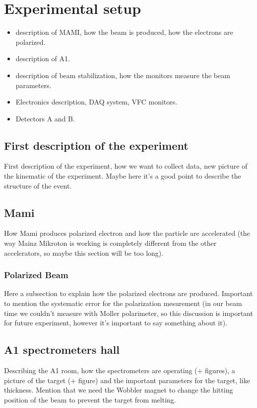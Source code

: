 \chapter{Experimental setup} \label{experiment}

\begin{itemize}
\item description of MAMI, how the beam is produced, how the electrons are polarized.
\item description of A1.
\item description of beam stabilization, how the monitors measure the beam parameters.
\item Electronics description, DAQ system, VFC monitors.
\item Detectors A and B.
\end{itemize}

\section{First description of the experiment}

First description of the experiment, how we want to collect data, new picture of the kinematic of the experiment. Maybe here it's a good point to describe the structure of the event.

\section{Mami}
How Mami produces polarized electron and how the particle are accelerated (the way Mainz Mikroton is working is completely different from the other accelerators, so maybe this section will be too long).

\subsection{Polarized Beam}
Here a subsection to explain how the polarized electrons are produced. Important to mention the systematic error for the polarization mesurement (in our beam time we couldn't measure with Moller polarimeter, so this discussion is important for future experiment, however it's important to say something about it).

\section{A1 spectrometers hall}

Describing the A1 room, how the spectrometers are operating (+ figures), a picture of the target (+ figure) and the important parameters for the target, like thickness. Mention that we need the Wobbler magnet to change the hitting position of the beam to prevent the target from melting.

